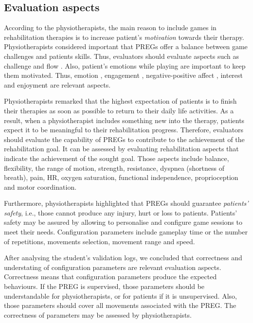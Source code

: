 \subsection{Evaluation aspects}
\label{sec:rehab_aspects}
According to the physiotherapists, the main reason to include games in rehabilitation therapies is to increase patient’s \textit{motivation} towards their therapy. Physiotherapists considered important that \acp{PREG} offer a balance between game challenges and patients skills. Thus, evaluators should evaluate aspects such as challenge \autocite{Moosajee,Nacke2009,VandenAbeele2016,Wiemeyer2016,Desurvire2009} and flow \autocite{Sinclair2007,Lapas2015,Bernhaupt2015,Nacke2009,Wiemeyer2016,Nijholt2008}. Also, patient's emotions while playing are important to keep them motivated. Thus, emotion \autocite{Bernhaupt2015,Sanchez2009,Wiemeyer2016}, engagement \autocite{Yanez-Gomez2017,Wiemeyer2016}, negative-positive affect \autocite{Nacke2009}, interest \autocite{VandenAbeele2016} and enjoyment \autocite{Ho2017,Li2016,VandenAbeele2016,Zhao2016,Li2006,Berkovsky2010} are relevant aspects.

Physiotherapists remarked that the highest expectation of patients is to finish their therapies as soon as possible to return to their daily life activities. As a result, when a physiotherapist includes something new into the therapy, patients expect it to be meaningful to their rehabilitation progress. Therefore, evaluators should evaluate the capability of \acp{PREG} to contribute to the achievement of the rehabilitation goal. It can be assessed by evaluating rehabilitation aspects that indicate the achievement of the sought goal. Those aspects include balance, flexibility, the range of motion, strength, resistance, dyspnea (shortness of breath), pain, \ac{HR}, oxygen saturation, functional independence, proprioception and motor coordination.

Furthermore, physiotherapists highlighted that \acp{PREG} should guarantee \textit{patients' safety}, i.e., those cannot produce any injury, hurt or loss to patients. Patients' safety may be assured by allowing to personalise and configure game sessions to meet their needs. Configuration parameters include gameplay time or the number of repetitions, movements selection, movement range and speed. 

After analysing the student's validation logs, we concluded that correctness and understating of configuration parameters are relevant evaluation aspects. Correctness means that configuration parameters produce the expected behaviours. If the \ac{PREG} is supervised, those parameters should be understandable for physiotherapists, or for patients if it is unsupervised. Also, those parameters should cover all movements associated with the \ac{PREG}. The correctness of parameters may be assessed by physiotherapists.

